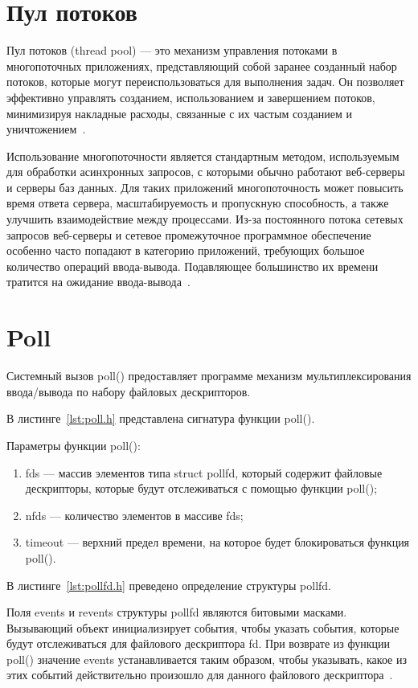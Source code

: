 \section{Пул потоков}
Пул потоков (thread pool) — это механизм управления потоками в многопоточных приложениях, представляющий собой заранее созданный набор потоков, которые могут переиспользоваться для выполнения задач. Он позволяет эффективно управлять созданием, использованием и завершением потоков, минимизируя накладные расходы, связанные с их частым созданием и уничтожением~\cite{pool}.

Использование многопоточности является стандартным методом, используемым для обработки асинхронных запросов, с которыми обычно
работают веб-серверы и серверы баз данных. Для таких приложений многопоточность может повысить время ответа сервера, масштабируемость и
пропускную способность, а также улучшить взаимодействие между процессами. Из-за постоянного потока
сетевых запросов веб-серверы и сетевое промежуточное программное обеспечение особенно часто попадают в
категорию приложений, требующих большое количество операций ввода-вывода. 
Подавляющее большинство их времени тратится на ожидание ввода-вывода~\cite{pool2}. 

\section{Poll}
Системный вызов poll() предоставляет программе механизм мультиплексирования ввода/вывода по набору файловых дескрипторов.

В листинге~\ref{lst:poll.h} представлена сигнатура функции poll().

Параметры функции poll():
\begin{enumerate}
    \item fds --- массив элементов типа struct pollfd, который содержит файловые дескрипторы, которые будут отслеживаться с помощью функции poll();
    \item nfds --- количество элементов в массиве fds;
    \item timeout --- верхний предел времени, на которое будет блокироваться функция poll().
\end{enumerate}

В листинге~\ref{lst:pollfd.h} преведено определение структуры pollfd.

Поля events и revents структуры pollfd являются битовыми масками. 
Вызывающий объект инициализирует события, чтобы указать события, которые будут отслеживаться для файлового дескриптора fd. 
При возврате из функции poll() значение events устанавливается таким образом, 
чтобы указывать, какое из этих событий действительно произошло для данного файлового дескриптора~\cite{tlpi}.

